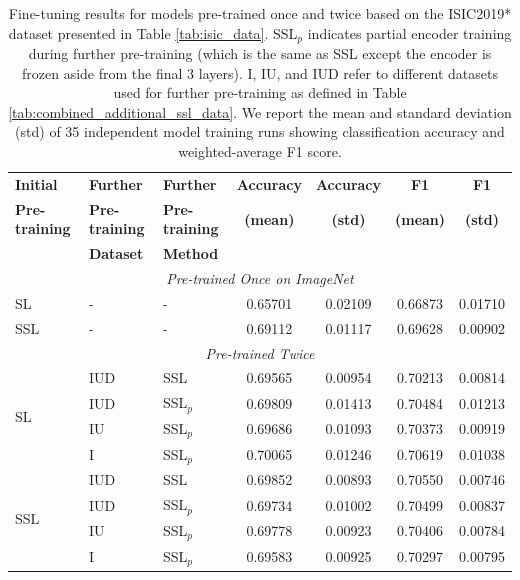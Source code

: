 \documentclass[a4paper,fleqn]{cas-dc}
\begin{document}
\begin{table}[htbp!]
\centering
\begin{tabular}{lllcccc}
\toprule
\textbf{Initial} & \textbf{Further} & \textbf{Further} & \textbf{Accuracy} & \textbf{Accuracy} & \textbf{F1} & \textbf{F1} \\
\textbf{Pre-training} & \textbf{Pre-training} & \textbf{Pre-training} & \textbf{(mean)} & \textbf{(std)} & \textbf{(mean)} & \textbf{(std)} \\
& \textbf{Dataset} & \textbf{Method} & & & & \\ 
\midrule
\multicolumn{7}{c}{\textit{Pre-trained Once on ImageNet}} \\
\midrule
SL & - & - & 0.65701 & 0.02109 & 0.66873 & 0.01710 \\
SSL & - & - & 0.69112 & 0.01117 & 0.69628 & 0.00902 \\
\midrule
\multicolumn{7}{c}{\textit{Pre-trained Twice}} \\
\midrule
\multirow{4}{*}{SL} & IUD & SSL & 0.69565 & 0.00954 & 0.70213 & 0.00814 \\
 & IUD & SSL$_p$ & 0.69809 & 0.01413 & 0.70484 & 0.01213 \\
 & IU & SSL$_p$ & 0.69686 & 0.01093 & 0.70373 & 0.00919 \\
 & I & SSL$_p$ & 0.70065 & 0.01246 & 0.70619 & 0.01038 \\
\midrule
\multirow{4}{*}{SSL} & IUD & SSL & 0.69852 & 0.00893 & 0.70550 & 0.00746 \\
 & IUD & SSL$_p$ & 0.69734 & 0.01002 & 0.70499 & 0.00837 \\
 & IU & SSL$_p$ & 0.69778 & 0.00923 & 0.70406 & 0.00784 \\
 & I & SSL$_p$ & 0.69583 & 0.00925 & 0.70297 & 0.00795 \\
\bottomrule
\end{tabular}
\caption{%
Fine-tuning results for models pre-trained once and twice based on the   ISIC2019* dataset presented in Table \ref{tab:isic_data}.
SSL$_p$ indicates partial encoder training during further pre-training (which is the same as SSL except the encoder is frozen aside from the final 3 layers).  I, IU, and IUD refer to different datasets used for further pre-training as defined in Table \ref{tab:combined_additional_ssl_data}. We report the mean and standard deviation (std) of 35 independent model training runs showing classification accuracy and weighted-average F1 score.}
\label{tab:combined_isic_semi_supervised_results}
\end{table}
\end{document}
